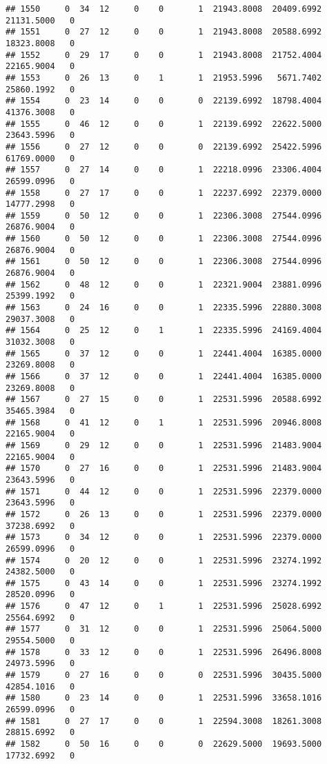 \documentclass[
]{article}
\begin{document}
\begin{enumerate}
\begin{verbatim}
## 1550     0  34  12     0    0       1  21943.8008  20409.6992  21131.5000   0
## 1551     0  27  12     0    0       1  21943.8008  20588.6992  18323.8008   0
## 1552     0  29  17     0    0       1  21943.8008  21752.4004  22165.9004   0
## 1553     0  26  13     0    1       1  21953.5996   5671.7402  25860.1992   0
## 1554     0  23  14     0    0       0  22139.6992  18798.4004  41376.3008   0
## 1555     0  46  12     0    0       1  22139.6992  22622.5000  23643.5996   0
## 1556     0  27  12     0    0       0  22139.6992  25422.5996  61769.0000   0
## 1557     0  27  14     0    0       1  22218.0996  23306.4004  26599.0996   0
## 1558     0  27  17     0    0       1  22237.6992  22379.0000  14777.2998   0
## 1559     0  50  12     0    0       1  22306.3008  27544.0996  26876.9004   0
## 1560     0  50  12     0    0       1  22306.3008  27544.0996  26876.9004   0
## 1561     0  50  12     0    0       1  22306.3008  27544.0996  26876.9004   0
## 1562     0  48  12     0    0       1  22321.9004  23881.0996  25399.1992   0
## 1563     0  24  16     0    0       1  22335.5996  22880.3008  29037.3008   0
## 1564     0  25  12     0    1       1  22335.5996  24169.4004  31032.3008   0
## 1565     0  37  12     0    0       1  22441.4004  16385.0000  23269.8008   0
## 1566     0  37  12     0    0       1  22441.4004  16385.0000  23269.8008   0
## 1567     0  27  15     0    0       1  22531.5996  20588.6992  35465.3984   0
## 1568     0  41  12     0    1       1  22531.5996  20946.8008  22165.9004   0
## 1569     0  29  12     0    0       1  22531.5996  21483.9004  22165.9004   0
## 1570     0  27  16     0    0       1  22531.5996  21483.9004  23643.5996   0
## 1571     0  44  12     0    0       1  22531.5996  22379.0000  23643.5996   0
## 1572     0  26  13     0    0       1  22531.5996  22379.0000  37238.6992   0
## 1573     0  34  12     0    0       1  22531.5996  22379.0000  26599.0996   0
## 1574     0  20  12     0    0       1  22531.5996  23274.1992  24382.5000   0
## 1575     0  43  14     0    0       1  22531.5996  23274.1992  28520.0996   0
## 1576     0  47  12     0    1       1  22531.5996  25028.6992  25564.6992   0
## 1577     0  31  12     0    0       1  22531.5996  25064.5000  29554.5000   0
## 1578     0  33  12     0    0       1  22531.5996  26496.8008  24973.5996   0
## 1579     0  27  16     0    0       0  22531.5996  30435.5000  42854.1016   0
## 1580     0  23  14     0    0       1  22531.5996  33658.1016  26599.0996   0
## 1581     0  27  17     0    0       1  22594.3008  18261.3008  28815.6992   0
## 1582     0  50  16     0    0       0  22629.5000  19693.5000  17732.6992   0

\end{verbatim}
\end{enumerate}
\end{document}
